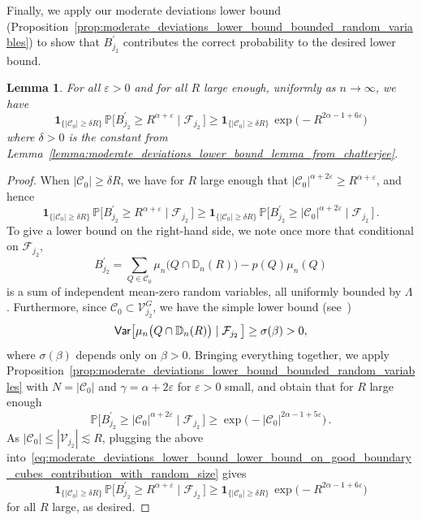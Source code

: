 \documentclass[11pt]{amsart}
\newtheorem{lemma}[theorem]{Lemma}
\theoremstyle{definition}
\theoremstyle{remark}
\numberwithin{equation}{section}
\def\eps{{\varepsilon}}
\def\La{{\Lambda}}
\newcommand{\bD}{\mathbb D}
\newcommand{\bP}{\mathbb P}
\newcommand{\Var}{{\sf Var}}
\begin{document}
	Finally, we apply our moderate deviations lower bound (Proposition~\ref{prop:moderate_deviations_lower_bound_bounded_random_variables}) to show that $B_{j_2}^\prime$ contributes the correct probability to the desired lower bound. 
	\begin{lemma}
		\label{lemma:moderate_deviations_lower_bound_good_boundary_correct_probabaility}
		For all $\eps>0$ and for all $R$ large enough, uniformly as $n\to \infty$, we have
		\[
		\mathbf{1}_{\{|\mathcal{C}_0| \ge \delta R \}} \, \bP\Big[ B_{j_2}^{\prime} \ge  R^{\alpha+\eps}  \mid \mathcal{F}_{j_2} \, \Big] \ge \mathbf{1}_{\{|\mathcal{C}_0| \ge \delta R \}} \, \exp\Big(-R^{2\alpha-1+6\eps}\Big)
		\]
		where $\delta>0$ is the constant from Lemma~\ref{lemma:moderate_deviations_lower_bound_lemma_from_chatterjee}.
	\end{lemma}
	\begin{proof}
		When $|\mathcal{C}_0| \ge \delta R$, we have for $R$ large enough that $|\mathcal{C}_0|^{\alpha+2\eps} \ge R^{\alpha+\eps}$, and hence
		\begin{equation}
			\label{eq:moderate_deviations_lower_bound_lower_bound_on_good_boundary_cubes_contribution_with_random_size}
			\mathbf{1}_{\{|\mathcal{C}_0| \ge \delta R \}} \, \bP\Big[ B_{j_2}^{\prime} \ge  R^{\alpha+\eps}  \mid \mathcal{F}_{j_2} \, \Big] \ge \mathbf{1}_{\{|\mathcal{C}_0| \ge \delta R \}} \, \bP\Big[ B_{j_2}^{\prime} \ge  |\mathcal{C}_0|^{\alpha+2\eps}  \mid \mathcal{F}_{j_2} \, \Big] \, .
		\end{equation}
		To give a lower bound on the right-hand side, we note once more that conditional on $\mathcal{F}_{j_2}$, 
		\[
		B_{j_2}^\prime = \sum_{Q\in \mathcal{C}_0} \mu_n\big(Q\cap \bD_n(R)\big) - p(Q) \mu_n(Q) 
		\]
		is a sum of independent mean-zero random variables, all uniformly bounded by $\La$. Furthermore, since $\mathcal{C}_0\subset \mathcal{V}_{j_2}^G$, we have the simple lower bound (see~\cite[Lemma~3.15]{chatterjee})
		\[
		\Var\big[\mu_n\big(Q\cap \bD_n(R)\big) \mid \mathcal{F}_{j_2} \, \big] \ge \sigma(\beta) >0,
		\]
		where $\sigma(\beta)$ depends only on $\beta>0$. Bringing everything together, we apply Proposition~\ref{prop:moderate_deviations_lower_bound_bounded_random_variables} with $N = |\mathcal{C}_0|$ and $\gamma= \alpha+2\eps$ for $\eps>0$ small, and obtain that for $R$ large enough
		\[
		\bP\Big[ B_{j_2}^{\prime} \ge  |\mathcal{C}_0|^{\alpha+2\eps}  \mid \mathcal{F}_{j_2} \, \Big] \ge \exp\Big(-|\mathcal{C}_0|^{2\alpha - 1 + 5\eps}\Big) \, .
		\]
		As $|\mathcal{C}_0| \le |\mathcal{V}_{j_2}| \lesssim R$, plugging the above into~\eqref{eq:moderate_deviations_lower_bound_lower_bound_on_good_boundary_cubes_contribution_with_random_size} gives
		\[
		\mathbf{1}_{\{|\mathcal{C}_0| \ge \delta R \}} \, \bP\Big[ B_{j_2}^{\prime} \ge  R^{\alpha+\eps}  \mid \mathcal{F}_{j_2} \, \Big] \ge \mathbf{1}_{\{|\mathcal{C}_0| \ge \delta R \}} \, \exp\Big(-R^{2\alpha-1+6\eps}\Big)
		\]
		for all $R$ large, as desired.
	\end{proof}
\end{document}
